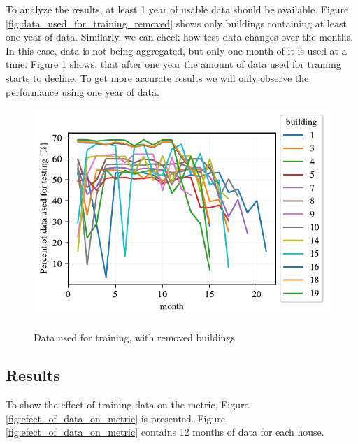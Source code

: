 To analyze the results, at least 1 year of usable data should be available. 
Figure \ref{fig:data_used_for_training_removed} shows only buildings containing at least one year of data.
Similarly, we can check how test data changes over the months. 
In this case, data is not being aggregated, but only one month of it is used at a time.
Figure \ref{fig:data_used_for_testing} shows, that after one year
the amount of data used for training starts to decline. 
To get more accurate results we will only observe the performance using one year of data. 

\begin{figure}[H]
	\centering
	\caption{Data used for training, with removed buildings}
	\includegraphics[]{Figures/EC/DYN/data_used_for_testing.pdf}
	\label{fig:data_used_for_testing}
\end{figure}

\subsection{Results}

To show the effect of training data on the metric, Figure \ref{fig:efect_of_data_on_metric} is presented.
Figure \ref{fig:efect_of_data_on_metric} contains 12 months of 
data for each house.

